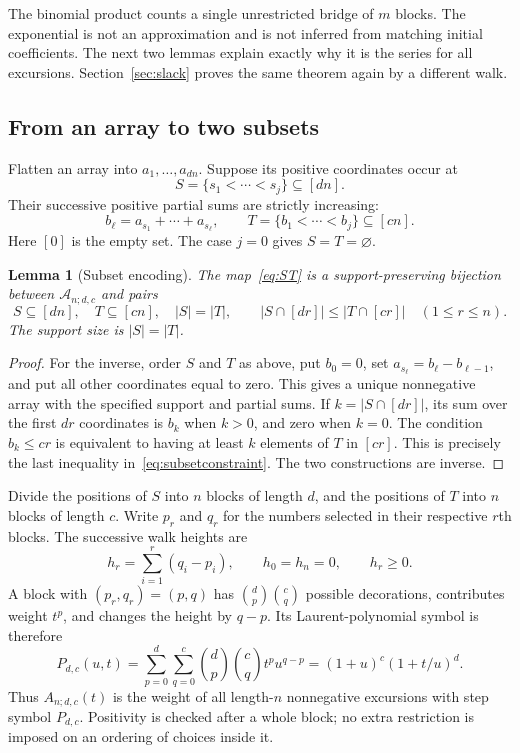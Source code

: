 \documentclass[11pt]{article}
\numberwithin{equation}{section}
\newtheorem{lemma}[theorem]{Lemma}
\theoremstyle{definition}
\newcommand{\Adc}[1]{A_{#1;d,c}}
\begin{document}
The binomial product counts a single unrestricted bridge of $m$ blocks.
The exponential is not an approximation and is not inferred from matching
initial coefficients. The next two lemmas explain exactly why it is the
series for all excursions. Section~\ref{sec:slack} proves the same theorem
again by a different walk.

\subsection{From an array to two subsets}
Flatten an array into $a_1,\ldots,a_{dn}$. Suppose its positive coordinates
occur at
\[
 S=\{s_1<\cdots<s_j\}\subseteq[dn].
\]
Their successive positive partial sums are strictly increasing:
\begin{equation}
 b_\ell=a_{s_1}+\cdots+a_{s_\ell},\qquad
 T=\{b_1<\cdots<b_j\}\subseteq[cn].
 \label{eq:ST}
\end{equation}
Here $[0]$ is the empty set. The case $j=0$ gives $S=T=\varnothing$.

\begin{lemma}[Subset encoding]
\label{lem:subsets}
The map~\eqref{eq:ST} is a support-preserving bijection between
$\mathcal A_{n;d,c}$ and pairs
\begin{equation}
 S\subseteq[dn],\quad T\subseteq[cn],\quad |S|=|T|,
 \qquad |S\cap[dr]|\leq |T\cap[cr]|\quad(1\leq r\leq n).
 \label{eq:subsetconstraint}
\end{equation}
The support size is $|S|=|T|$.
\end{lemma}
\begin{proof}
For the inverse, order $S$ and $T$ as above, put $b_0=0$, set
$a_{s_\ell}=b_\ell-b_{\ell-1}$, and put all other coordinates equal to zero.
This gives a unique nonnegative array with the specified support and partial
sums. If $k=|S\cap[dr]|$, its sum over the first $dr$ coordinates is $b_k$
when $k>0$, and zero when $k=0$. The condition $b_k\leq cr$ is equivalent to
having at least $k$ elements of $T$ in $[cr]$. This is precisely the last
inequality in~\eqref{eq:subsetconstraint}. The two constructions are inverse.
\end{proof}

Divide the positions of $S$ into $n$ blocks of length $d$, and the positions
of $T$ into $n$ blocks of length $c$. Write $p_r$ and $q_r$ for the numbers
selected in their respective $r$th blocks. The successive walk heights are
\begin{equation}
 h_r=\sum_{i=1}^r(q_i-p_i),\qquad h_0=h_n=0,\qquad h_r\geq0.
 \label{eq:heights}
\end{equation}
A block with $(p_r,q_r)=(p,q)$ has
$\binom dp\binom cq$ possible decorations, contributes weight $t^p$, and
changes the height by $q-p$. Its Laurent-polynomial symbol is therefore
\begin{equation}
 P_{d,c}(u,t)=\sum_{p=0}^d\sum_{q=0}^c
  \binom dp\binom cq t^p u^{q-p}
  =(1+u)^c(1+t/u)^d.
 \label{eq:symbol}
\end{equation}
Thus $\Adc n(t)$ is the weight of all length-$n$ nonnegative excursions
with step symbol $P_{d,c}$. Positivity is checked after a whole block;
no extra restriction is imposed on an ordering of choices inside it.
\end{document}
